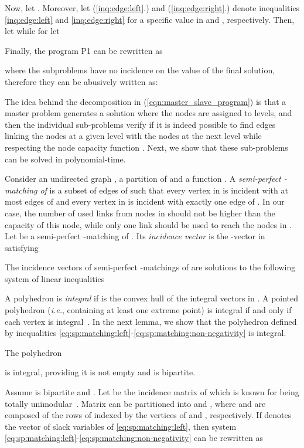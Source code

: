 Now, let .  
Moreover, let (\ref{inq:edge:left}.) and (\ref{inq:edge:right}.) denote
inequalities \eqref{inq:edge:left} and \eqref{inq:edge:right} for a
specific value  in  and , respectively. Then,
let
 \noindent while for  let





Finally, the program P1 can be rewritten as

where the subproblems have no incidence on the value of the final
solution, therefore they can be abusively written as:



The idea behind the decomposition in (\ref{eqn:master_slave_program})
is that a master problem generates a solution where the nodes are
assigned to levels, and then the individual sub-problems verify if it
is indeed possible to find edges linking the nodes at a given level
with the nodes at the next level while respecting the node capacity
function . Next, we show that these sub-problems can be solved in
polynomial-time.

Consider an undirected graph , a partition
 of  and a function .  A {\em semi-perfect -matching of } is a subset
 of edges of  such that every vertex  in  is incident
with at most  edges of  and every vertex in  is incident
with exactly one edge of . In our case, the number of used links
from nodes in  should not be higher than the capacity of this
node, while only one link should be used to reach the nodes in .
Let  be a semi-perfect -matching of . Its {\em incidence
  vector}  is the -vector in 
satisfying

The incidence vectors of semi-perfect -matchings of  are solutions
to the following system of linear inequalities


A polyhedron  is {\em integral} if  is the convex hull of the
integral vectors in . A pointed polyhedron  (\textit{i.e.},
containing at least one extreme point) is integral if and only if each
vertex is integral~\cite{schrijver2003cop}.  In the next lemma, we
show that the polyhedron defined by inequalities
\eqref{eq:sp:matching:left}-\eqref{eq:sp:matching:non-negativity} is
integral.

\begin{lemma} \label{lemma:semi-perfect:matching polytope}
The polyhedron

is integral, providing it is not empty and  is bipartite.
\end{lemma}
\bopr Assume  is bipartite and .
Let  be the incidence matrix of  which is known for being
totally unimodular~\cite{motzkin}. Matrix  can be partitioned
into  and , where  and  are
composed of the rows of  indexed by the vertices of  and
, respectively.  If  denotes the vector of slack variables of
\eqref{eq:sp:matching:left}, then system
\eqref{eq:sp:matching:left}-\eqref{eq:sp:matching:non-negativity} can
be rewritten as

